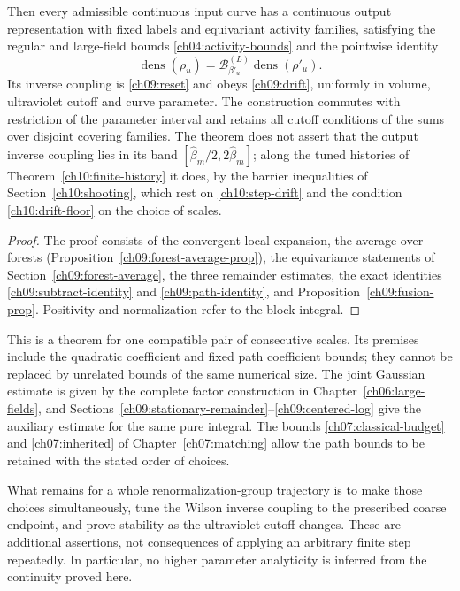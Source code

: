 \begin{theorem}
Then every admissible continuous input curve has a
continuous output representation with fixed labels and equivariant activity families,
satisfying the regular and large-field bounds
\eqref{ch04:activity-bounds} and the pointwise identity
\[
 \operatorname{dens}(\rho_u)
       =\mathcal B^{(L)}_{\beta'_u}\operatorname{dens}(\rho'_u).
\]
Its inverse coupling is \eqref{ch09:reset} and obeys \eqref{ch09:drift}, uniformly in
volume, ultraviolet cutoff and curve parameter. The construction
commutes with restriction of the parameter interval and retains all cutoff conditions of the sums over disjoint covering families. The theorem does not assert that the output inverse coupling lies in its band
$[\widehat\beta_m/2,2\widehat\beta_m]$; along the tuned histories of Theorem~\ref{ch10:finite-history} it does, by the barrier inequalities of Section~\ref{ch10:shooting}, which rest on \eqref{ch10:step-drift} and the condition \eqref{ch10:drift-floor} on the choice of
scales.
\end{theorem}

\begin{proof}
The proof consists of the convergent local expansion, the average over forests (Proposition~\ref{ch09:forest-average-prop}), the equivariance statements of Section~\ref{ch09:forest-average},
the three remainder estimates, the exact identities
\eqref{ch09:subtract-identity} and
\eqref{ch09:path-identity}, and
Proposition~\ref{ch09:fusion-prop}. Positivity and
normalization refer to the block integral.
\end{proof}

This is a theorem for one compatible pair of consecutive scales. Its premises
include the quadratic coefficient and fixed path coefficient bounds;
they cannot be replaced by unrelated bounds of the same numerical
size. The joint Gaussian estimate is given by the complete
factor construction in Chapter~\ref{ch06:large-fields}, and
Sections~\ref{ch09:stationary-remainder}--\ref{ch09:centered-log}
give the auxiliary estimate for the same pure integral. The
bounds \eqref{ch07:classical-budget} and \eqref{ch07:inherited} of
Chapter~\ref{ch07:matching} allow the path bounds to be retained
with the stated order of choices.

What remains for a whole renormalization-group trajectory is to make those choices
simultaneously, tune the Wilson inverse coupling to the prescribed coarse
endpoint, and prove stability as the ultraviolet cutoff changes.
These are additional assertions, not consequences of applying an
arbitrary finite step repeatedly. In particular, no higher parameter
analyticity is inferred from the continuity proved here.
